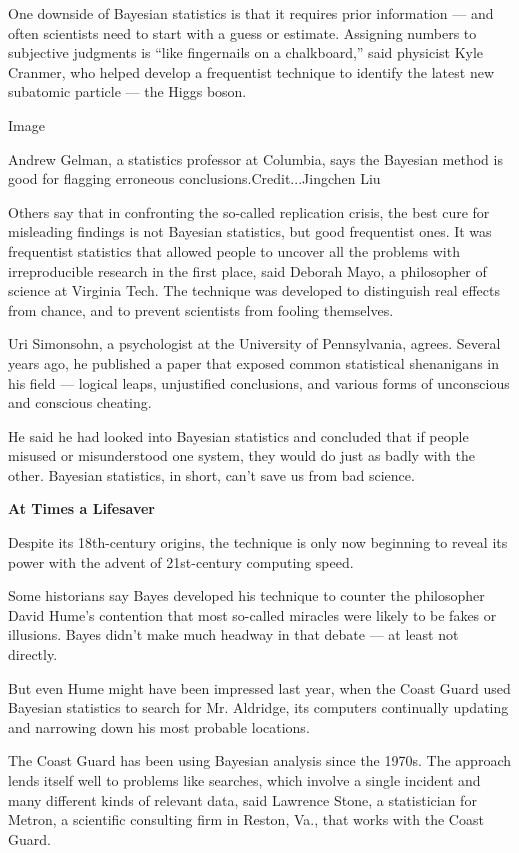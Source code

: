 One downside of Bayesian statistics is that it requires prior
information --- and often scientists need to start with a guess or
estimate. Assigning numbers to subjective judgments is ``like
fingernails on a chalkboard,'' said physicist Kyle Cranmer, who helped
develop a frequentist technique to identify the latest new subatomic
particle --- the Higgs boson.

Image

Andrew Gelman, a statistics professor at Columbia, says the Bayesian
method is good for flagging erroneous conclusions.Credit...Jingchen Liu

Others say that in confronting the so-called replication crisis, the
best cure for misleading findings is not Bayesian statistics, but good
frequentist ones. It was frequentist statistics that allowed people to
uncover all the problems with irreproducible research in the first
place, said Deborah Mayo, a philosopher of science at Virginia Tech. The
technique was developed to distinguish real effects from chance, and to
prevent scientists from fooling themselves.

Uri Simonsohn, a psychologist at the University of Pennsylvania, agrees.
Several years ago, he published a paper that exposed common statistical
shenanigans in his field --- logical leaps, unjustified conclusions, and
various forms of unconscious and conscious cheating.

He said he had looked into Bayesian statistics and concluded that if
people misused or misunderstood one system, they would do just as badly
with the other. Bayesian statistics, in short, can't save us from bad
science.

\textbf{At Times a Lifesaver}

Despite its 18th-century origins, the technique is only now beginning to
reveal its power with the advent of 21st-century computing speed.

Some historians say Bayes developed his technique to counter the
philosopher David Hume's contention that most so-called miracles were
likely to be fakes or illusions. Bayes didn't make much headway in that
debate --- at least not directly.

But even Hume might have been impressed last year, when the Coast Guard
used Bayesian statistics to search for Mr. Aldridge, its computers
continually updating and narrowing down his most probable locations.

The Coast Guard has been using Bayesian analysis since the 1970s. The
approach lends itself well to problems like searches, which involve a
single incident and many different kinds of relevant data, said Lawrence
Stone, a statistician for Metron, a scientific consulting firm in
Reston, Va., that works with the Coast Guard.

